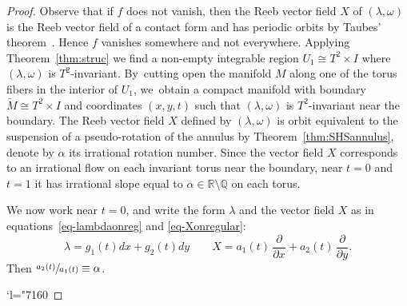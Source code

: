 \documentclass[10pt]{amsart}
\newcommand{\Changel}{\mathcode`l="7160}
\theoremstyle{definition}
\newcommand{\pp}[2]{\frac{\partial#1}{\partial#2}}
\begin{document}
\begin{proof}
Observe that if $f$ does not vanish, then the Reeb vector field $X$ of $(\lambda, \omega)$ is the Reeb vector field of a contact form and has periodic orbits by Taubes' theorem~\cite{Taub}. Hence $f$ vanishes somewhere and not everywhere. Applying Theorem~\ref{thm:struc} we find a non-empty integrable region $U_1\cong T^2\times I$ where $(\lambda,\omega)$ is $T^2$-invariant. By~cutting open the manifold $M$ along one of the torus fibers in the interior of $U_1$, we~obtain a compact manifold with boundary $\widetilde M\cong T^2\times I$ and coordinates $(x,y,t)$ such that $(\lambda,\omega)$ is $T^2$-invariant near the boundary. The Reeb vector field $X$ defined by $(\lambda,\omega)$ is orbit equivalent to the suspension of a pseudo-rotation of the annulus by Theorem~\ref{thm:SHSannulus}, denote by $\alpha$ its irrational rotation number. Since the vector field $X$ corresponds to an irrational flow on each invariant torus near the boundary, near $t=0$ and $t=1$ it has irrational slope equal to $\alpha\in\mathbb{R}\setminus\mathbb{Q}$ on each torus.

We now work near $t=0$, and write the form $\lambda$ and the vector field $X$ as in equations~\eqref{eq-lambdaonreg} and \eqref{eq-Xonregular}:
\[
\lambda=g_1(t)dx+g_2(t)dy \qquad X= a_1(t)\,\pp{}{x}+a_2(t)\,\pp{}{y}.
\]
Then $\sfrac{a_2(t)}{a_1(t)}\equiv \alpha$.

\Changel


\end{proof}
\end{document}
